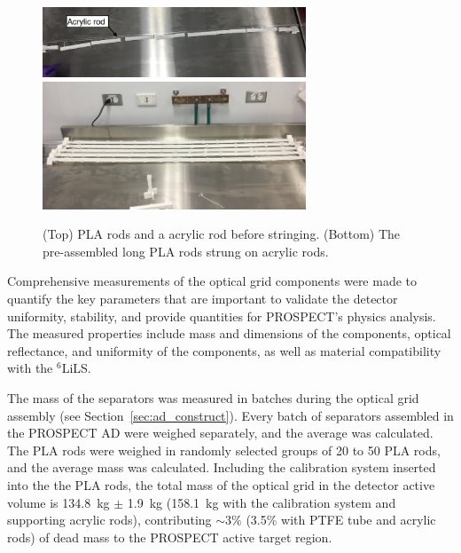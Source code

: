 \begin{figure}[h!]
\centering
\includegraphics[width=0.7\textwidth]{Figures/PinwheelPreAssemble1.png}\\

\includegraphics[width=0.7\textwidth]{Figures/PinwheelPreAssemble2.png}
\caption [Stringing of the PLA rods]{(Top) PLA rods and a acrylic rod before stringing. (Bottom) The pre-assembled long PLA rods strung on acrylic rods.}
\label{fig:pinwheelPreclean}
\end{figure}

Comprehensive measurements of the optical grid components were made to quantify the key parameters that are important to validate the detector uniformity, stability, and provide quantities for PROSPECT's physics analysis.
The measured properties include mass and dimensions of the components, optical reflectance, and uniformity of the components, as well as material compatibility with the $^6$LiLS.

The mass of the separators was measured in batches during the optical grid assembly (see Section~\ref{sec:ad_construct}).
Every batch of separators assembled in the PROSPECT AD were weighed separately, and the average was calculated.
The PLA rods were weighed in randomly selected groups of 20 to 50 PLA rods, and the average mass was calculated.
Including the calibration system inserted into the the PLA rods, the total mass of the optical grid in the detector active volume is 134.8~kg $\pm$ 1.9~kg (158.1~kg with the calibration system and supporting acrylic rods), contributing $\sim3\%$ (3.5\% with PTFE tube and acrylic rods) of dead mass to the PROSPECT active target region.

